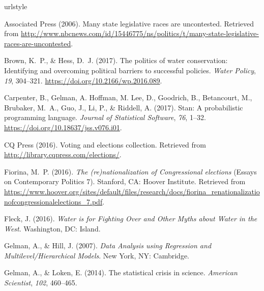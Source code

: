 \documentclass[draft,linenumbers]{agujournal}
\begin{document}
\begin{thebibliography}{33}
\providecommand{\natexlab}[1]{#1}
\expandafter\ifx\csname urlstyle\endcsname\relax
  \providecommand{\doi}[1]{doi:\discretionary{}{}{}#1}\else
  \providecommand{\doi}{doi:\discretionary{}{}{}\begingroup
  \urlstyle{rm}\Url}\fi

  Associated Press (2006).
  Many state legislative races are uncontested.
  Retrieved from
  \url{http://www.nbcnews.com/id/15446775/ns/politics/t/many-state-legislative-races-are-uncontested}.

  Brown, K.~P., \& Hess, D.~J. (2017).
  The politics of water conservation:
  Identifying and overcoming political barriers to successful policies.
  \textit{Water Policy}, \textit{19}, 304--321.
  \url{https://doi.org/10.2166/wp.2016.089}.

  Carpenter, B., Gelman, A. Hoffman, M. Lee, D., Goodrich, B., Betancourt, M.,
  Brubaker, M.~A., Guo, J., Li, P., \& Riddell, A. (2017).
  Stan: A probabilistic programming language.
  \textit{Journal of Statistical Software}, \textit{76}, 1--32.
  \url{https://doi.org/10.18637/jss.v076.i01}.

{CQ Press} (2016).
  Voting and elections collection.
  Retrieved from
  \url{http://library.cqpress.com/elections/}.

  Fiorina, M.~P. (2016).
  \textit{The (re)nationalization of {C}ongressional elections\/}
  (Essays on Contemporary Politics 7).
  Stanford, CA: Hoover Institute.
  Retrieved from
  \url{https://www.hoover.org/sites/default/files/research/docs/fiorina_renationalizationofcongressionalelections_7.pdf}.

  Fleck, J. (2016).
  \textit{Water is for Fighting Over and Other Myths about Water in the West}.
  Washington, DC: Island.

  Gelman, A., \& Hill, J. (2007).
  \textit{Data Analysis using Regression and Multilevel/Hierarchical Models}.
  New York, NY: Cambridge.

  Gelman, A., \& Loken, E. (2014).
  The statistical crisis in science.
  \textit{American Scientist}, \textit{102}, 460--465.


\end{thebibliography}
\end{document}
